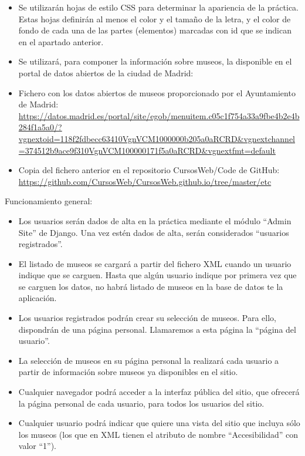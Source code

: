 \begin{itemize}
\item Se utilizarán hojas de estilo CSS para determinar la apariencia de la práctica. Estas hojas definirán al menos el color y el tamaño de la letra, y el color de fondo de cada una de las partes (elementos) marcadas con id que se indican en el apartado anterior.

\item Se utilizará, para componer la información sobre museos, la disponible en el portal de datos abiertos de la ciudad de Madrid:

  \item Fichero con los datos abiertos de museos proporcionado por el Ayuntamiento de Madrid: \\
    \url{https://datos.madrid.es/portal/site/egob/menuitem.c05c1f754a33a9fbe4b2e4b284f1a5a0/?vgnextoid=118f2fdbecc63410VgnVCM1000000b205a0aRCRD&vgnextchannel=374512b9ace9f310VgnVCM100000171f5a0aRCRD&vgnextfmt=default}

  \item Copia del fichero anterior en el repositorio CursosWeb/Code de GitHub: \\
    \url{https://github.com/CursosWeb/CursosWeb.github.io/tree/master/etc}
\end{itemize}

Funcionamiento general:

\begin{itemize}
  \item Los usuarios serán dados de alta en la práctica mediante el módulo ``Admin Site'' de Django. Una vez estén dados de alta, serán considerados ``usuarios registrados''.

  \item El listado de museos se cargará a partir del fichero XML cuando un usuario indique que se carguen. Hasta que algún usuario indique por primera vez que se carguen los datos, no habrá listado de museos en la base de datos te la aplicación.

  \item Los usuarios registrados podrán crear su selección de museos. Para ello, dispondrán de una página personal. Llamaremos a esta página la ``página del usuario''.

  \item La selección de museos en su página personal la realizará cada usuario a partir de información sobre museos ya disponibles en el sitio.

  \item Cualquier navegador podrá acceder a la interfaz pública del sitio, que ofrecerá la página personal de cada usuario, para todos los usuarios del sitio.

  \item Cualquier usuario podrá indicar que quiere una vista del sitio que incluya sólo los museos (los que en XML tienen el atributo de nombre ``Accesibilidad'' con valor ``1'').
\end{itemize}


